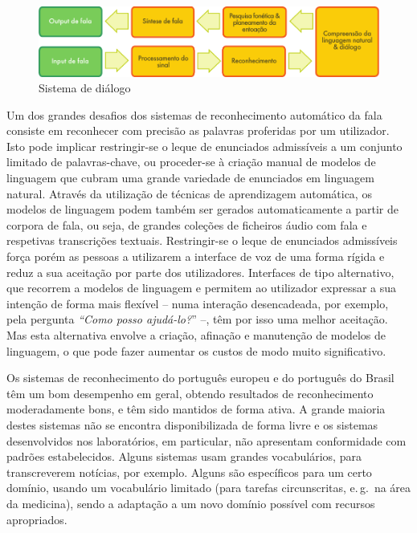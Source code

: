 \begin{multicols}{2}
\begin{figure}[htb]
  \center 
  \includegraphics[width=\textwidth]{../_media/portuguese/simple_speech-based_dialogue_architecture}
  \caption{Sistema de diálogo}
  \label{fig:dialoguearch_de}
\end{figure}


Um dos grandes desafios dos sistemas de re\-co\-nhe\-ci\-men\-to automático da fala consiste em 
reconhecer com precisão as palavras proferidas por um utilizador. 
Isto pode implicar restringir-se o leque de enunciados admissíveis a um conjunto limitado de palavras-chave, 
ou proceder-se à criação manual de modelos de linguagem que cubram uma grande variedade de enunciados em linguagem natural. 
Através da utilização de técnicas de aprendizagem automática, os modelos de linguagem podem também
ser gerados automaticamente a partir de corpora de fala, ou seja, de grandes coleções de ficheiros
áudio com fala e respetivas transcrições textuais.
Restringir-se o leque de enunciados admissíveis força porém as pessoas a utilizarem a interface de voz
de uma forma rígida e reduz a sua aceitação por parte dos utilizadores. 
Interfaces de tipo alternativo, que recorrem a modelos de linguagem e permitem ao utilizador expressar a sua intenção
de forma mais flexível -- numa interação desencadeada, por exemplo, pela pergunta \textit{“Como posso ajudá-lo?}” --,
têm por isso uma melhor aceitação. Mas esta alternativa envolve a criação, 
afinação e manutenção de modelos de linguagem, o que pode fazer aumentar os custos de modo muito significativo. 

Os sistemas de reconhecimento do português europeu e do português do Brasil têm um bom desempenho em geral, 
obtendo resultados de reconhecimento moderadamente bons, e têm sido mantidos de forma ativa.
A grande maioria destes sistemas não se encontra disponibilizada de forma livre e os sistemas
desenvolvidos nos laboratórios, em particular, não apresentam conformidade com padrões estabelecidos. 
Alguns sistemas usam grandes vocabulários, para transcreverem notícias, por exemplo. 
Alguns são específicos para um certo domínio, usando um vocabulário limitado 
(para tarefas circunscritas, e.\,g.~na área da medicina), sendo a adaptação a um novo domínio 
possível com recursos apropriados.


\end{multicols}
